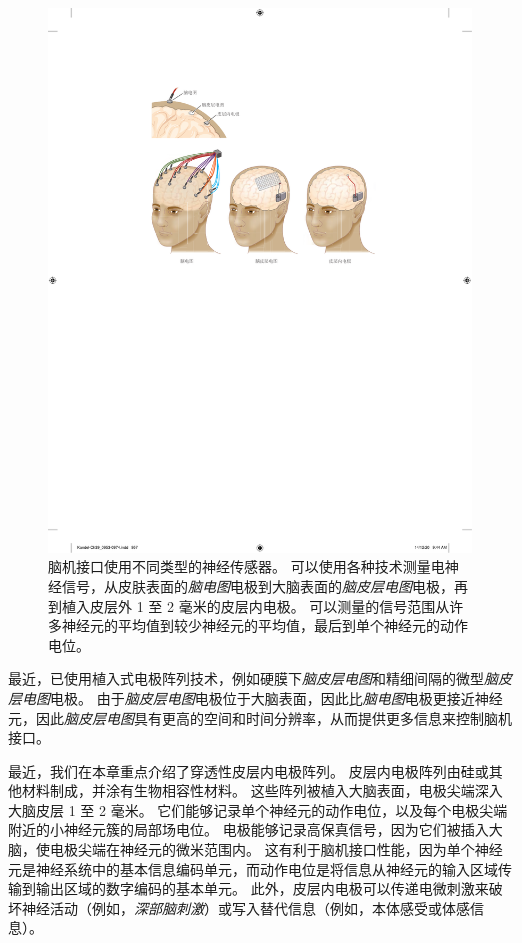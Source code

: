 \begin{figure}[htbp]
	\centering
	\includegraphics[width=0.8\linewidth]{chap39/fig_39_2}
	\caption{脑机接口使用不同类型的神经传感器。 
		可以使用各种技术测量电神经信号，从皮肤表面的\textit{脑电图}电极到大脑表面的\textit{脑皮层电图}电极，再到植入皮层外 1 至 2 毫米的皮层内电极。 
		可以测量的信号范围从许多神经元的平均值到较少神经元的平均值，最后到单个神经元的动作电位\cite{blabe2015assessment}。}
	\label{fig:39_2}
\end{figure}


最近，已使用植入式电极阵列技术，例如硬膜下\textit{脑皮层电图}和精细间隔的微型\textit{脑皮层电图}电极。
由于\textit{脑皮层电图}电极位于大脑表面，因此比\textit{脑电图}电极更接近神经元，因此\textit{脑皮层电图}具有更高的空间和时间分辨率，从而提供更多信息来控制脑机接口。


最近，我们在本章重点介绍了穿透性皮层内电极阵列。
皮层内电极阵列由硅或其他材料制成，并涂有生物相容性材料。
这些阵列被植入大脑表面，电极尖端深入大脑皮层 1 至 2 毫米。
它们能够记录单个神经元的动作电位，以及每个电极尖端附近的小神经元簇的局部场电位。
电极能够记录高保真信号，因为它们被插入大脑，使电极尖端在神经元的微米范围内。
这有利于脑机接口性能，因为单个神经元是神经系统中的基本信息编码单元，而动作电位是将信息从神经元的输入区域传输到输出区域的数字编码的基本单元。
此外，皮层内电极可以传递电微刺激来破坏神经活动（例如，\textit{深部脑刺激}）或写入替代信息（例如，本体感受或体感信息）。


